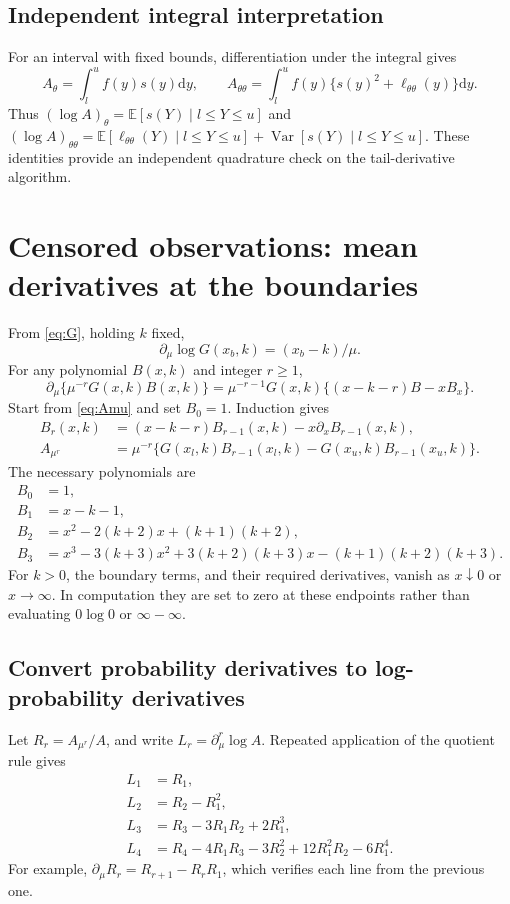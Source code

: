 \documentclass[11pt,a4paper]{article}
\newcommand{\E}{\mathbb{E}}
\newcommand{\Var}{\operatorname{Var}}
\newcommand{\dd}{\mathrm{d}}
\begin{document}
\subsection{Independent integral interpretation}
For an interval with fixed bounds, differentiation under the integral gives
\begin{equation}
 A_\theta=\int_l^u f(y)s(y)\dd y,\qquad
 A_{\theta\theta}=\int_l^u f(y)
       \{s(y)^2+\ell_{\theta\theta}(y)\}\dd y.
 \label{eq:integrals}
\end{equation}
Thus $(\log A)_\theta=\E[s(Y)\mid l\leq Y\leq u]$ and
$(\log A)_{\theta\theta}=\E[\ell_{\theta\theta}(Y)\mid l\leq Y\leq u]
+\Var[s(Y)\mid l\leq Y\leq u]$. These identities provide an independent
quadrature check on the tail-derivative algorithm.

\newpage
\section{Censored observations: mean derivatives at the boundaries}
From \eqref{eq:G}, holding $k$ fixed,
\[
 \partial_\mu\log G(x_b,k)=(x_b-k)/\mu.
\]
For any polynomial $B(x,k)$ and integer $r\geq1$,
\begin{equation}
 \partial_\mu\{\mu^{-r}G(x,k)B(x,k)\}
 =\mu^{-r-1}G(x,k)\{(x-k-r)B-xB_x\}.
 \label{eq:recurrenceproof}
\end{equation}
Start from \eqref{eq:Amu} and set $B_0=1$. Induction gives
\begin{align}
 B_r(x,k)&=(x-k-r)B_{r-1}(x,k)-x\partial_xB_{r-1}(x,k),\label{eq:Brec}\\
 A_{\mu^r}&=\mu^{-r}\{G(x_l,k)B_{r-1}(x_l,k)
                     -G(x_u,k)B_{r-1}(x_u,k)\}.
 \label{eq:Ar}
\end{align}
The necessary polynomials are
\begin{align}
 B_0&=1,\\
 B_1&=x-k-1,\\
 B_2&=x^2-2(k+2)x+(k+1)(k+2),\\
 B_3&=x^3-3(k+3)x^2+3(k+2)(k+3)x
          -(k+1)(k+2)(k+3).
 \label{eq:Bexplicit}
\end{align}
For $k>0$, the boundary terms, and their required derivatives, vanish as
$x\downarrow0$ or $x\to\infty$. In computation they are set to zero at
these endpoints rather than evaluating $0\log0$ or $\infty-\infty$.

\subsection{Convert probability derivatives to log-probability derivatives}
Let $R_r=A_{\mu^r}/A$, and write $L_r=\partial_\mu^r\log A$. Repeated
application of the quotient rule gives
\begin{align}
 L_1&=R_1,\\
 L_2&=R_2-R_1^2,\\
 L_3&=R_3-3R_1R_2+2R_1^3,\\
 L_4&=R_4-4R_1R_3-3R_2^2+12R_1^2R_2-6R_1^4.
 \label{eq:logderivs}
\end{align}
For example, $\partial_\mu R_r=R_{r+1}-R_rR_1$, which verifies each line
from the previous one.
\end{document}
